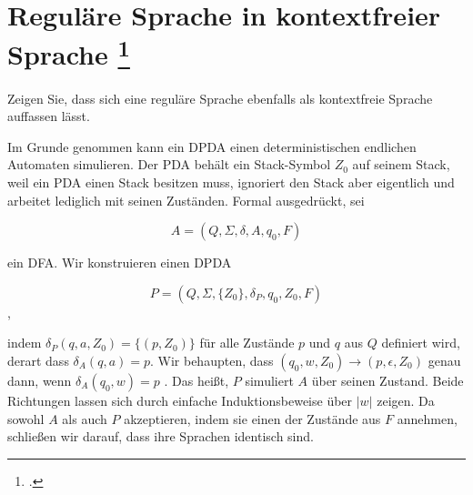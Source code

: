 \documentclass{lehramt-informatik-aufgabe}
\begin{document}
\section{Reguläre Sprache in kontextfreier Sprache
\footcite{theo:ab:2}}

Zeigen Sie, dass sich eine reguläre Sprache ebenfalls als kontextfreie
Sprache auffassen lässt.

\begin{liAntwort}
Im Grunde genommen kann ein DPDA einen deterministischen endlichen
Automaten simulieren. Der PDA behält ein Stack-Symbol $Z_0$ auf seinem
Stack, weil ein PDA einen Stack besitzen muss, ignoriert den Stack aber
eigentlich und arbeitet lediglich mit seinen Zuständen. Formal
ausgedrückt, sei

\begin{displaymath}
A = (Q, \Sigma, \delta, A, q_0, F)
\end{displaymath}

ein DFA. Wir konstruieren einen DPDA

\begin{displaymath}
P = (Q, \Sigma, \{Z_0 \}, \delta_P, q_0, Z_0, F )
\end{displaymath}
,

indem $\delta_P(q, a, Z_0) = \{(p, Z_0)\}$ für alle Zustände $p$ und $q$
aus $Q$ definiert wird, derart dass $\delta_A(q, a) = p$. Wir behaupten,
dass $(q_0, w, Z_0) \rightarrow (p, \epsilon, Z_0)$ genau dann, wenn
$\delta_A (q_0 , w) = p$ . Das heißt, $P$ simuliert $A$ über seinen
Zustand. Beide Richtungen lassen sich durch einfache Induktionsbeweise
über $|w|$ zeigen. Da sowohl $A$ als auch $P$ akzeptieren, indem sie
einen der Zustände aus $F$ annehmen, schließen wir darauf, dass ihre
Sprachen identisch sind.
\end{liAntwort}
\end{document}
